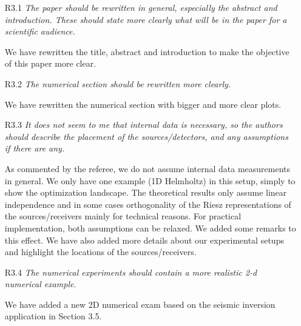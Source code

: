 \documentclass[11pt]{article}
\newcommand{\mycomment}[1]{\textit{\color{bluey}#1}}
\begin{document}
\begin{itemize}
    \item[R3.1] \mycomment{The paper should be rewritten in general, especially the abstract and introduction. These should state more clearly what will be in the paper for a scientific audience.}


We have rewritten the title, abstract and introduction to make the objective of this paper more clear.


    \item[R3.2] \mycomment{The numerical section should be rewritten more clearly.}

We have rewritten the numerical section with bigger and more clear plots.


    \item[R3.3] \mycomment{ It does not seem to me that internal data is necessary, so the authors should describe the placement of the sources/detectors, and any assumptions if there are any.}

    As commented by the referee, we do not assume internal data measurements in general. We only have one example (1D Helmholtz) in this setup, simply to show the optimization landscape. The theoretical results only assume linear independence and in some cases orthogonality of the Riesz representations of the sources/receivers mainly for technical reasons. For practical implementation, both assumptions can be relaxed. We added some remarks to this effect. We have also added more details about our experimental setups and highlight the locations of the sources/receivers.

    \item[R3.4] \mycomment{The numerical experiments should contain a more realistic 2-d numerical example.}

We have added a new  2D numerical exam based on the seismic inversion application in Section 3.5.

\end{itemize}
\clearpage


\end{document}
